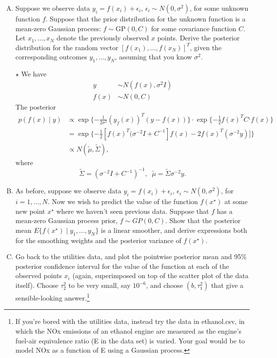 \documentclass[11pt]{article}
\newcommand{\jie}{$\star$ }
\begin{document}
\begin{enumerate}[(A)]

\item Suppose we observe data $y_i = f(x_i) + \epsilon_i$, $\epsilon_i \sim N(0, \sigma^2)$, for some unknown function $f$. Suppose that the prior distribution for the unknown function is a mean-zero Gaussian process: $f \sim \mbox{GP}(0, C)$ for some covariance function $C$.  Let $x_1, \ldots, x_N$ denote the previously observed $x$ points.  Derive the posterior distribution for the random vector $[f(x_1), \ldots, f(x_N)]^T$, given the corresponding outcomes $y_1, \ldots, y_N$, assuming that you know $\sigma^2$.

\bigskip \jie
We have 
\begin{align*}
    y &\sim N(f(x), \sigma^2 I) \\
    f(x) &\sim N(0,C)
\end{align*}
The posterior 
\begin{align*}
    p(f(x) \mid y) &\propto \exp\{-\frac{1}{2\sigma^2} (y _ f(x))^T(y - f(x)) \} \cdot \exp \{ -\frac{1}2 f(x)^T C^{_1} f(x) \} \\
    &= \exp \{ -\frac{1}2 [f(x)^T (\sigma^{-2} I + C^{-1}] f(x) - 2 f(x)^T (\sigma^{-2}y)] \} \\
    &\propto N(\tilde{\mu}, \tilde{\Sigma}),
\end{align*}
where
$$\tilde{\Sigma} = (\sigma^{-2}I + C^{-1})^{-1}, \;\; \tilde{\mu} = \tilde{\Sigma} \sigma^{-2}y.$$

\item As before, suppose we observe data $y_i = f(x_i) + \epsilon_i$, $\epsilon_i \sim N(0, \sigma^2)$, for $i=1, \ldots, N$.  Now we wish to predict the value of the function $f(x^{\star})$ at some new point $x^{\star}$ where we haven't seen previous data.  Suppose that $f$ has a mean-zero Gaussian process prior, $f \sim GP(0, C)$.  Show that the posterior mean $E\{ f(x^{\star}) \mid y_1, \ldots, y_N \}$ is a linear smoother, and derive expressions both for the smoothing weights and the posterior variance of $f(x^{\star})$.

\item Go back to the utilities data, and plot the pointwise posterior mean and 95\% posterior confidence interval for the value of the function at each of the observed points $x_i$ (again, superimposed on top of the scatter plot of the data itself).  Choose $\tau^2_2$ to be very small, say $10^{-6}$, and choose $(b, \tau^2_1)$ that give a sensible-looking answer.\footnote{If you're bored with the utilities data, instead try the data in ethanol.csv, in which the NOx emissions of an ethanol engine are measured as the engine's fuel-air equivalence ratio (E in the data set) is varied.  Your goal would be to model NOx as a function of E using a Gaussian process. }


\end{enumerate}
\end{document}
